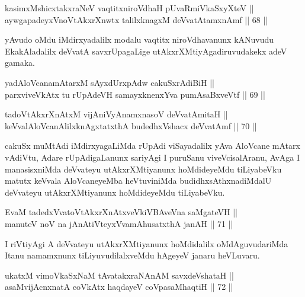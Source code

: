 
\begin{shl}
kasimxMshicxtakxraNeV vaqtitxniroVdhaH pUvaRmiVkaSxyXteV || \\
aywgapadeyxVnoVtAkxrXnwtx talilxknagxM deVvatAtamxnAmf \hfill || 68 ||  
\end{shl}

\begin{artha}
yAvudo oMdu iMdirxyadalilx modalu vaqtitx niroVdhavanunx kANuvudu
EkakAladalilx deVvatA savxrUpagaLige utAkxrXMtiyAgadiruvudakekx adeV
gamaka.
\end{artha}

\begin{shl}
yadA\s \s loVcanamAtarxM sAyxdUrxpAdw cakuSxrAdiBiH || \\
parxviveVkAtx tu rUpAdeVH samayxknenxYva pumAsaBxveVtf \hfill || 69 ||  
\end{shl}

\begin{shl}
tadoVtAkxrXnAtxM vijAniVyAnamxnasoV deVvatAmitaH || \\
keVvalAloVcanAlilxknAgxtatxthA budedhxVshacx deVvatAmf \hfill || 70 ||  
\end{shl}

\begin{artha}
cakuSx muMtAdi iMdirxyagaLiMda rUpAdi viSayadalilx yAva AloVcane
mAtarx vAdiVtu, Adare rUpAdigaLanunx sariyAgi I puruSanu
viveVcisalAranu, AvAga I manasisxniMda deVvateyu utAkxrXMtiyanunx
hoMdideyeMdu tiLiyabeVku matutx keVvala AloVcaneyeMba heVtuviniMda
budidhxsAthxnadiMdalU deVvateyu utAkxrXMtiyanunx hoMdideyeMdu
tiLiyabeVku.
\end{artha}

\begin{shl}
EvaM tadedxVvatoVtAkxrXnAtxveVkiVBAveVna saMgateVH || \\
manuteV noV na jAnAtiVteyxVvamAhusatxthA janAH \hfill || 71 ||  
\end{shl}

\begin{artha}
I riVtiyAgi A deVvateyu utAkxrXMtiyanunx hoMdidalilx oMdAguvudariMda
Itanu namamxnunx tiLiyuvudilalxveMdu hAgeyeV janaru heVLuvaru.
\end{artha}

\begin{shl}
ukatxM vimoVkaSxNaM tAvatakxraNAnAM savxdeVshataH || \\
asaMvijAcnxnatA coVkAtx haqdayeV coVpasaMhaqtiH \hfill || 72 ||  
\end{shl}

